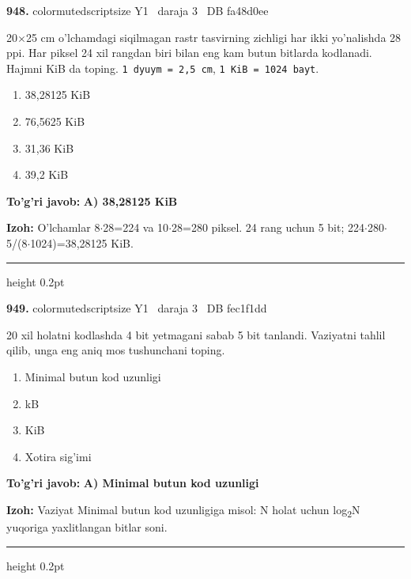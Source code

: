 \documentclass[10pt,a4paper,oneside]{article}
\begin{document}
\noindent\textbf{\color{ink}948.}  {color{muted}scriptsize Y1 \textbullet\ daraja 3 \textbullet\ DB fa48d0ee}
\par
20\ensuremath{\times}25 cm o'lchamdagi siqilmagan rastr tasvirning zichligi har ikki yo'nalishda 28 ppi. Har piksel 24 xil rangdan biri bilan eng kam butun bitlarda kodlanadi. Hajmni KiB da toping. \texttt{1 dyuym = 2,5 cm}, \texttt{1 KiB = 1024 bayt}.
\begin{enumerate}[label=\Alph*),leftmargin=9mm]
\item 38,28125 KiB
\item 76,5625 KiB
\item 31,36 KiB
\item 39,2 KiB
\end{enumerate}
\begin{tcolorbox}[enhanced,breakable,colback=teal!4,colframe=teal!50!black,boxrule=0.5pt,arc=1.1mm,left=3mm,right=3mm,top=1.7mm,bottom=1.7mm,before skip=2mm,after skip=2mm]
\textbf{\color{teal}To'g'ri javob:} \textbf{A) 38,28125 KiB}
\par\smallskip
\textbf{Izoh:} O'lchamlar 8\ensuremath{\cdot}28=224 va 10\ensuremath{\cdot}28=280 piksel. 24 rang uchun 5 bit; 224\ensuremath{\cdot}280\ensuremath{\cdot}5/(8\ensuremath{\cdot}1024)=38,28125 KiB.
\end{tcolorbox}
\vspace{2mm}\hrule height 0.2pt \vspace{3mm}

\noindent\textbf{\color{ink}949.}  {color{muted}scriptsize Y1 \textbullet\ daraja 3 \textbullet\ DB fec1f1dd}
\par
20 xil holatni kodlashda 4 bit yetmagani sabab 5 bit tanlandi. Vaziyatni tahlil qilib, unga eng aniq mos tushunchani toping.
\begin{enumerate}[label=\Alph*),leftmargin=9mm]
\item Minimal butun kod uzunligi
\item kB
\item KiB
\item Xotira sig'imi
\end{enumerate}
\begin{tcolorbox}[enhanced,breakable,colback=teal!4,colframe=teal!50!black,boxrule=0.5pt,arc=1.1mm,left=3mm,right=3mm,top=1.7mm,bottom=1.7mm,before skip=2mm,after skip=2mm]
\textbf{\color{teal}To'g'ri javob:} \textbf{A) Minimal butun kod uzunligi}
\par\smallskip
\textbf{Izoh:} Vaziyat Minimal butun kod uzunligiga misol: N holat uchun log\textsubscript{2}N yuqoriga yaxlitlangan bitlar soni.
\end{tcolorbox}
\vspace{2mm}\hrule height 0.2pt \vspace{3mm}
\end{document}
